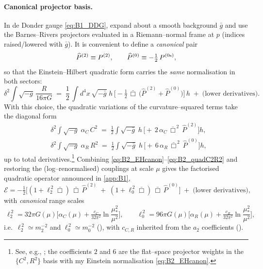 \documentclass{iopjournal}
\begin{document}
\paragraph{Canonical projector basis.}
In de Donder gauge \eqref{eq:B1_DDG}, expand about a smooth background $\bar g$ and use the Barnes–Rivers projectors evaluated in a Riemann–normal frame at $p$ (indices raised/lowered with $\bar g$). It is convenient to define a \emph{canonical} pair
\[
\widehat P^{(2)}\equiv P^{(2)},
\qquad
\widehat P^{(0)}\equiv -\tfrac12\,P^{(0{\rm s})},
\]
so that the Einstein–Hilbert quadratic form carries the \emph{same} normalisation in both sectors:
\begin{equation}
\delta^2\!\int\!\sqrt{-g}\,\frac{R}{16\pi G}
\;=\;
\frac12\,\int d^4x\,\sqrt{-\bar g}\;h\,
\Big[-\tfrac12\,\bar\Box\,\big(\widehat P^{(2)}+\widehat P^{(0)}\big)\Big]\,h
\;+\;\text{(lower derivatives)}.
\label{eq:B2_EHcanon}
\end{equation}
With this choice, the quadratic variations of the curvature–squared terms take the diagonal form
\begin{equation}
\begin{aligned}
&\delta^2\!\int\!\sqrt{-g}\;\alpha_C\,C^2
\;=\;
\frac12\int\!\sqrt{-\bar g}\;h\,
\Big[+\,2\,\alpha_C\,\bar\Box^{\,2}\,\widehat P^{(2)}\Big]h,\\
&\delta^2\!\int\!\sqrt{-g}\;\alpha_R\,R^2
\;=\;
\frac12\int\!\sqrt{-\bar g}\;h\,
\Big[+\,6\,\alpha_R\,\bar\Box^{\,2}\,\widehat P^{(0)}\Big]h,
\end{aligned}
\label{eq:B2_quadC2R2}
\end{equation}
up to total derivatives.\footnote{See, e.g., \cite{Stelle1977,ParkerToms}; the coefficients $2$ and $6$ are the flat–space projector weights in the $\{C^2,R^2\}$ basis with my Einstein normalisation \eqref{eq:B2_EHcanon}.}
Combining \eqref{eq:B2_EHcanon}–\eqref{eq:B2_quadC2R2} and restoring the (log–renormalised) couplings at scale $\mu$ gives the factorised quadratic operator announced in \cref{app:B1},
\begin{equation}
\mathcal{E}
=-\tfrac12\Big[(1+\ell_2^{\,2}\bar\Box)\,\bar\Box\,\widehat P^{(2)}
\;+\;
(1+\ell_0^{\,2}\bar\Box)\,\bar\Box\,\widehat P^{(0)}\Big]
\;+\;\text{(lower derivatives)},
\label{eq:B2_factor_final}
\end{equation}
with \emph{canonical} range scales
\begin{equation}
\boxed{\
\ell_2^{\,2}=32\pi G(\mu)\Big[\alpha_C(\mu)+\tfrac{c_C}{32\pi^2}\ln\!\frac{\mu_*^2}{\mu^2}\Big],
\qquad
\ell_0^{\,2}=96\pi G(\mu)\Big[\alpha_R(\mu)+\tfrac{c_R}{32\pi^2}\ln\!\frac{\mu_*^2}{\mu^2}\Big],
}
\label{eq:B2_ranges}
\end{equation}
i.e.\ $\ell_2^{\,2}\!\simeq m_2^{-2}$ and $\ell_0^{\,2}\!\simeq m_0^{-2}$ (), with $c_{C,R}$ inherited from the $a_2$ coefficients ().
\end{document}
